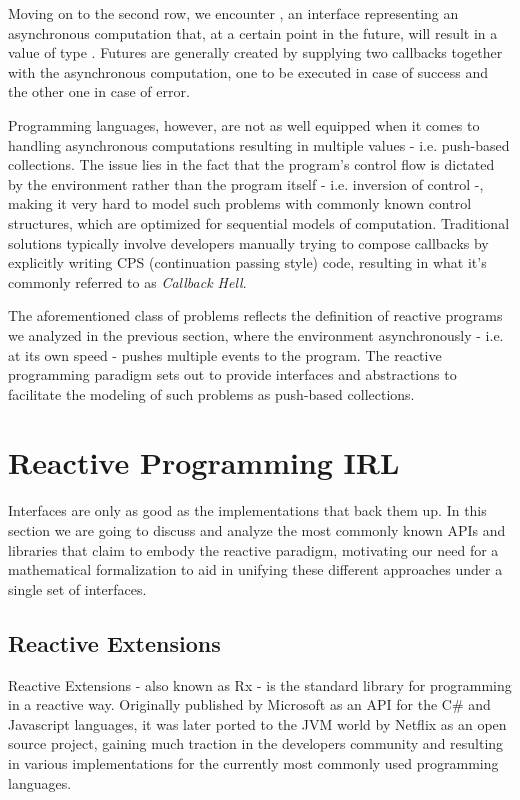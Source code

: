 Moving on to the second row, we encounter , an interface representing an asynchronous computation that, at a certain point in the future, will result in a value of type . Futures are generally created by supplying two callbacks together with the asynchronous computation, one to be executed in case of success and the other one in case of error. 

Programming languages, however, are not as well equipped when it comes to handling asynchronous computations resulting in multiple values - i.e. push-based collections. The issue lies in the fact that the program's control flow is dictated by the environment rather than the program itself - i.e. inversion of control -, making it very hard to model such problems with commonly known control structures, which are optimized for sequential models of computation. Traditional solutions typically involve developers manually trying to compose callbacks by explicitly writing CPS (continuation passing style) code\cite{meijer2015spicing}, resulting in what it's commonly referred to as \textit{Callback Hell}\cite{edwards2009coherent}.

The aforementioned class of problems reflects the definition of reactive programs we analyzed in the previous section, where the environment asynchronously - i.e. at its own speed - pushes multiple events to the program. The reactive programming paradigm sets out to provide interfaces and abstractions to facilitate the modeling of such problems as push-based collections. 

\section{Reactive Programming IRL}

Interfaces are only as good as the implementations that back them up. In this section we are going to discuss and analyze the most commonly known APIs and libraries that claim to embody the reactive paradigm, motivating our need for a mathematical formalization to aid in unifying these different approaches under a single set of interfaces. 

\subsection{Reactive Extensions}
\label{subsec:rx}

Reactive Extensions - also known as Rx - is the standard library for programming in a reactive way. Originally published by Microsoft as an API for the C\# and Javascript languages, it was later ported to the JVM world by Netflix as an open source project, gaining much traction in the developers community and resulting in various implementations for the currently most commonly used programming languages\cite{ReactiveX}.

